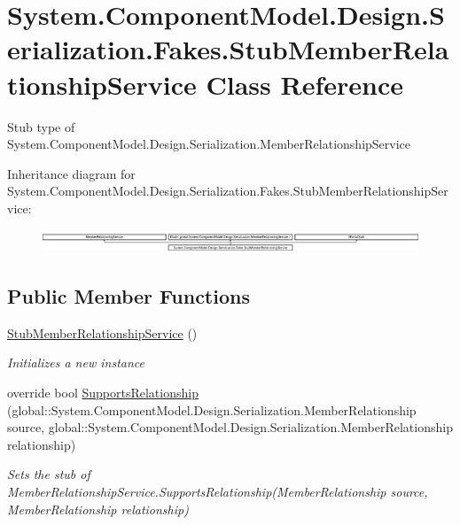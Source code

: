 \hypertarget{class_system_1_1_component_model_1_1_design_1_1_serialization_1_1_fakes_1_1_stub_member_relationship_service}{\section{System.\-Component\-Model.\-Design.\-Serialization.\-Fakes.\-Stub\-Member\-Relationship\-Service Class Reference}
\label{class_system_1_1_component_model_1_1_design_1_1_serialization_1_1_fakes_1_1_stub_member_relationship_service}
}


Stub type of System.\-Component\-Model.\-Design.\-Serialization.\-Member\-Relationship\-Service 


Inheritance diagram for System.\-Component\-Model.\-Design.\-Serialization.\-Fakes.\-Stub\-Member\-Relationship\-Service\-:\begin{figure}[H]
\begin{center}
\leavevmode
\includegraphics[height=0.704403cm]{class_system_1_1_component_model_1_1_design_1_1_serialization_1_1_fakes_1_1_stub_member_relationship_service}
\end{center}
\end{figure}
\subsection*{Public Member Functions}
\begin{DoxyCompactItemize}
\item 
\hyperlink{class_system_1_1_component_model_1_1_design_1_1_serialization_1_1_fakes_1_1_stub_member_relationship_service_a98b1cf5fc0fd2c1c982baa46eb56657a}{Stub\-Member\-Relationship\-Service} ()
\begin{DoxyCompactList}\small\item\em Initializes a new instance\end{DoxyCompactList}\item 
override bool \hyperlink{class_system_1_1_component_model_1_1_design_1_1_serialization_1_1_fakes_1_1_stub_member_relationship_service_a524cb6b76bed0674699e5e567c171019}{Supports\-Relationship} (global\-::\-System.\-Component\-Model.\-Design.\-Serialization.\-Member\-Relationship source, global\-::\-System.\-Component\-Model.\-Design.\-Serialization.\-Member\-Relationship relationship)
\begin{DoxyCompactList}\small\item\em Sets the stub of Member\-Relationship\-Service.\-Supports\-Relationship(\-Member\-Relationship source, Member\-Relationship relationship)\end{DoxyCompactList}\end{DoxyCompactItemize}
